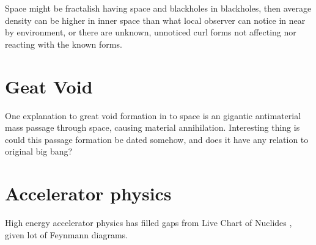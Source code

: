 Space might be fractalish having space and blackholes in blackholes, then
average density can be higher in inner space than what local observer can
notice in near by environment, or there are unknown, unnoticed curl forms
not affecting nor reacting with the known forms.

\section{Geat Void}
\label{great_void}

One explanation to great void formation in to space is an gigantic antimaterial
mass passage through space, causing material annihilation. Interesting thing is
could this passage formation be dated somehow, and does it have any relation to
original big bang?

\section{Accelerator physics}
\label{accelerator_physics}

High energy accelerator physics has filled gaps from Live Chart of Nuclides
\cite{Nuclides}, given lot of Feynmann diagrams\cite{FeynmannDiagram}.

\begin{comment}\end{comment}
